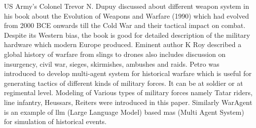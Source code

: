 \documentclass[]{article}
\begin{document}
US Army’s Colonel Trevor N. Dupuy \autocite{dupuy1990evolution} discussed about different weapon system in his book about the Evolution of Weapons and Warfare (1990) which had evolved from 2000 BCE onwards till the Cold War and their tactical impact on combat. Despite its Western bias, the book is good for detailed description of the military hardware which modern Europe produced. Eminent author K Roy \autocite{Roy2022} described a global history of warfare from slings to drones also includes discussion on insurgency, civil war, sieges, skirmishes, ambushes and raids.
Petro \autocite{6928214} was introduced to develop multi-agent system for historical warfare which is useful for generating tactics of different kinds of military forces. It can be at soldier or at regimental level. Modeling of Various types of military forces namely Tatar riders, line infantry, Heussars, Reiters were introduced in this paper. 
Similarly WarAgent \autocite{hua2024war} is an example of \acrshort{llm} (\Gls{Large Language Model}) based \acrshort{mas} (\Gls{Multi Agent System}) for simulation of historical events.
\end{document}
